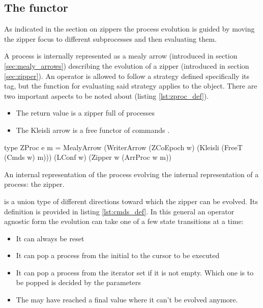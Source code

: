 \subsection{The  functor}
\label{sec:cmds_functor}

As indicated in the section on zippers the process evolution is guided
by moving the zipper focus to different subprocesses and then
evaluating them.

A process is internally represented as a mealy arrow (introduced in
section \ref{sec:mealy_arrows}) describing the evolution of a zipper
(introduced in section \ref{sec:zipper}). An operator is allowed to
follow a strategy defined specifically its  tag,
but the function for evaluating said strategy applies to the
 object. There are two important aspects to be noted about
 (listing \ref{lst:zproc_def}).

\begin{itemize}
\item The return value is a zipper full of processes 
\item The Kleisli arrow is a free functor of commands .
\end{itemize}

\begin{code}
\begin{haskellcode}
type ZProc e m =
  MealyArrow
    (WriterArrow (ZCoEpoch w) (Kleisli (FreeT (Cmds w) m)))
    (LConf w)
    (Zipper w (ArrProc w m))
\end{haskellcode}
\label{lst:zproc_def}
\caption{An internal representation of the process evolving the internal representation of a process: the zipper.}
\end{code}


 is a union type of different directions toward which the
zipper can be evolved. Its definition is provided in listing
\ref{lst:cmds_def}. In this general an operator agnostic form the
evolution can take one of a few state transitions at a time:

\begin{itemize}
\item It can always be reset
\item It can pop a process from the initial to the cursor to be executed
\item It can pop a process from the iterator set if it is not
  empty. Which one is to be popped is decided by the parameters
\item The may have reached a final value where it can't be evolved
  anymore.
\end{itemize}

